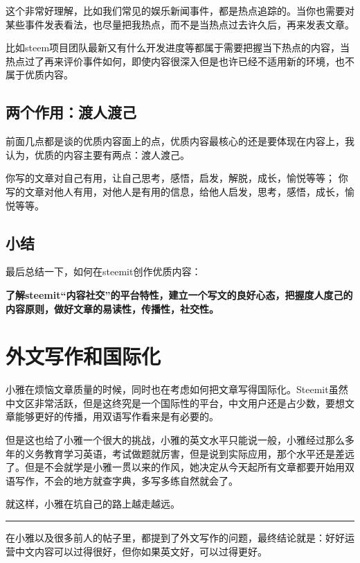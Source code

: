 \documentclass[]{ctexbook}
\begin{document}
这个非常好理解，比如我们常见的娱乐新闻事件，都是热点追踪的。当你也需要对某些事件发表看法，也尽量把我热点，而不是当热点过去许久后，再来发表文章。

比如steem项目团队最新又有什么开发进度等都属于需要把握当下热点的内容，当热点过了再来评价事件如何，即使内容很深入但是也许已经不适用新的环境，也不属于优质内容。

\subsection{两个作用：渡人渡己}

前面几点都是谈的优质内容面上的点，优质内容最核心的还是要体现在内容上，我认为，优质的内容主要有两点：渡人渡己。

你写的文章对自己有用，让自己思考，感悟，启发，解脱，成长，愉悦等等；
你写的文章对他人有用，对他人是有用的信息，给他人启发，思考，感悟，成长，愉悦等等。

\subsection{小结}

最后总结一下，如何在steemit创作优质内容：

\textbf{了解steemit``内容社交''的平台特性，建立一个写文的良好心态，把握度人度己的内容原则，做好文章的易读性，传播性，社交性。}

\hypertarget{gjh}{%
\section{外文写作和国际化}\label{gjh}}

小雅在烦恼文章质量的时候，同时也在考虑如何把文章写得国际化。Steemit虽然中文区非常活跃，但是这终究是一个国际性的平台，中文用户还是占少数，要想文章能够更好的传播，用双语写作看来是有必要的。

但是这也给了小雅一个很大的挑战，小雅的英文水平只能说一般，小雅经过那么多年的义务教育学习英语，考试做题就厉害，但是说到实际应用，那个水平还是差远了。但是不会就学是小雅一贯以来的作风，她决定从今天起所有文章都要开始用双语写作，不会的地方就查字典，多写多练自然就会了。

就这样，小雅在坑自己的路上越走越远。

\begin{center}\rule{0.5\linewidth}{\linethickness}\end{center}

在小雅以及很多前人的帖子里，都提到了外文写作的问题，最终结论就是：好好运营中文内容可以过得很好，但你如果英文好，可以过得更好。
\end{document}
